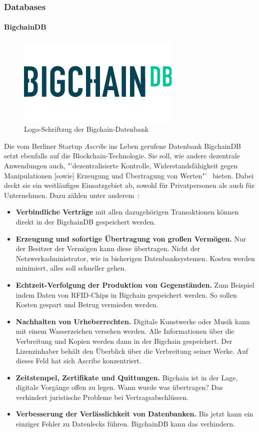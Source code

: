 \subsubsection{Databases}


\paragraph{BigchainDB}

\begin{figure}
	\centering
	\includegraphics[scale=0.5]{images/bigchaindb_logo}
	\caption{Logo-Schriftzug der Bigchain-Datenbank~\cite{Vecta.io.2019}}
	\label{fig:bigchaindb}
\end{figure}

Die vom Berliner Startup \textit{Ascribe} ins Leben gerufene Datenbank BigchainDB setzt ebenfalls auf die Blockchain-Technologie. Sie soll, wie andere dezentrale Anwendungen auch, "'dezentralisierte Kontrolle, Widerstandsf{\"a}higkeit gegen Manipulationen [sowie] Erzeugung und {\"U}bertragung von Werten"'~\cite{Schmiechen.2016} bieten. Dabei deckt sie ein weitläufiges Einsatzgebiet ab, sowohl für Privatpersonen als auch für Unternehmen. Dazu zählen unter anderem~\cite{Schmiechen.2016}:

\begin{itemize}
	\item \textbf{Verbindliche Verträge} mit allen dazugehörigen Transaktionen können direkt in der BigchainDB gespeichert werden.
	\item \textbf{Erzeugung und sofortige Übertragung von großen Vermögen.} Nur der Besitzer der Vermögen kann diese übertragen. Nicht der Netzwerkadministrator, wie in bisherigen Datenbanksystemen. Kosten werden minimiert, alles soll schneller gehen.
	\item \textbf{Echtzeit-Verfolgung der Produktion von Gegenständen.} Zum Beispiel indem Daten von RFID-Chips in Bigchain gespeichert werden. So sollen Kosten gespart und Betrug vermieden werden.
	\item \textbf{Nachhalten von Urheberrechten.} Digitale Kunstwerke oder Musik kann mit einem Wasserzeichen versehen werden. Alle Informationen über die Verbreitung und Kopien werden dann in der Bigchain gespeichert. Der Lizenzinhaber behält den Überblick über die Verbreitung seiner Werke. Auf dieses Feld hat sich Ascribe konzentriert.
	\item \textbf{Zeitstempel, Zertifikate und Quittungen.} Bigchain ist in der Lage, digitale Vorgänge offen zu legen. Wann wurde was übertragen? Das verhindert juristische Probleme bei Vertragsabschlüssen.
	\item \textbf{Verbesserung der Verlässlichkeit von Datenbanken.} Bis jetzt kann ein einziger Fehler zu Datenlecks führen. BigchainDB kann das verhindern.
\end{itemize}

